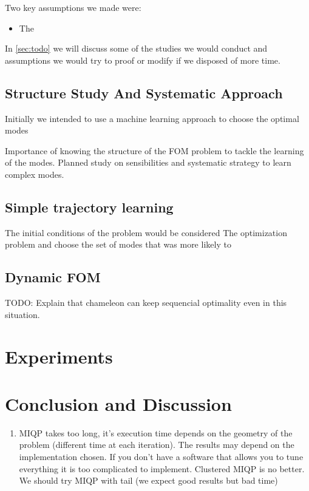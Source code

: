 \documentclass[12,twoside]{TFG-GM}
\theoremstyle{definition}
\theoremstyle{remark}
\begin{document}
Two key assumptions we made were:
\begin{itemize}
\item The
\end{itemize}

In \ref{sec:todo} we will discuss some of the studies we would conduct and assumptions we would try to proof or modify if we disposed of more time.

\subsection{Structure Study And Systematic Approach}
\label{subsec:structure}
Initially we intended to use a machine learning approach to choose the optimal modes 

Importance of knowing the structure of the FOM problem to tackle the learning of the modes. Planned study on sensibilities and systematic strategy to learn complex modes.

\subsection{Simple trajectory learning}
\label{subsec:learningsimple}
The initial conditions of the problem would be considered The optimization problem and choose the set of modes that was more likely to 

\subsection{Dynamic FOM}
TODO: Explain that chameleon can keep sequencial optimality even in this situation.

\section{Experiments}
\label{sec:experiments}

\section{Conclusion and Discussion}
\label{sec:conclusion}
\begin{enumerate}
\item{MIQP} takes too long, it's execution time depends on the geometry of the problem (different time at each iteration). The results may depend on the implementation chosen. If you don't have a software that allows you to tune everything it is too complicated to implement. Clustered MIQP is no better. We should try MIQP with tail (we expect good results but bad time)
\end{enumerate}
\end{document}
